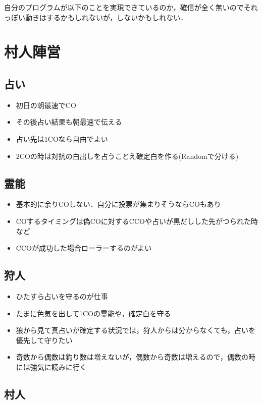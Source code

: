 \documentclass[a4paper]{jarticle}
\begin{document}
自分のプログラムが以下のことを実現できているのか，確信が全く無いのでそれっぽい動きはするかもしれないが，しないかもしれない．

\section{村人陣営}

\subsection{占い}

\begin{itemize}
    \item 初日の朝最速でCO
    \item その後占い結果も朝最速で伝える
    \item 占い先は1COなら自由でよい
    \item 2COの時は対抗の白出しを占うことえ確定白を作る(Randomで分ける)
\end{itemize}

\subsection{霊能}

\begin{itemize}
    \item 基本的に余りCOしない．自分に投票が集まりそうならCOもあり
    \item COするタイミングは偽COに対するCCOや占いが黒だしした先がつられた時など
    \item CCOが成功した場合ローラーするのがよい
\end{itemize}

\subsection{狩人}

\begin{itemize}
    \item ひたすら占いを守るのが仕事
    \item たまに色気を出して1COの霊能や，確定白を守る
    \item 狼から見て真占いが確定する状況では，狩人からは分からなくても，占いを優先して守りたい
    \item 奇数から偶数は釣り数は増えないが，偶数から奇数は増えるので，偶数の時には強気に読みに行く
\end{itemize}

\subsection{村人}
\end{document}
